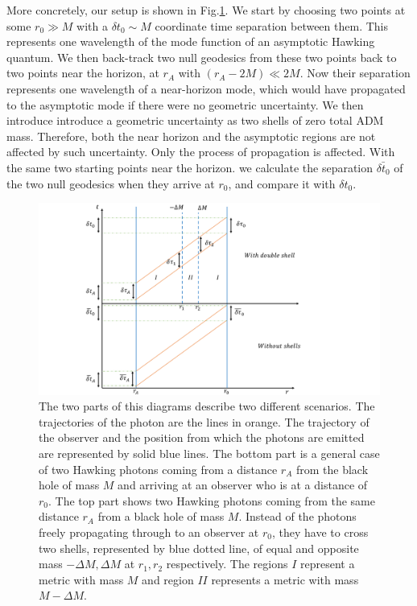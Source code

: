 \documentclass[aps,showpacs,twocolumn,floats,prd,superscriptaddress,nofootinbib]{revtex4-1}
\begin{document}
More concretely, our setup is shown in Fig.\ref{fig-setup}. 
We start by choosing two points at some $r_0\gg M$ with a $\delta t_0\sim M$ coordinate time separation between them.
This represents one wavelength of the mode function of an asymptotic Hawking quantum.
We then back-track two null geodesics from these two points back to two points near the horizon, at $r_A$ with $(r_A-2M)\ll 2M$.
Now their separation represents one wavelength of a near-horizon mode, which would have propagated to the asymptotic mode if there were no geometric uncertainty. 
We then introduce introduce a geometric uncertainty as two shells of zero total ADM mass. 
Therefore, both the near horizon and the asymptotic regions are not affected by such uncertainty.
Only the process of propagation is affected.
With the same two starting points near the horizon. we calculate the separation $\bar{\delta t_0}$ of the two null geodesics when they arrive at $r_0$, and compare it with $\delta t_0$.

\begin{figure}[tb]
\begin{center}
\includegraphics[scale = 0.6]{Propertime.pdf}
\caption{The two parts of this diagrams describe two different scenarios. The trajectories of the photon are the lines in orange. The trajectory of the observer and the position from which the photons are emitted are represented by solid blue lines. The bottom part is a general case of two Hawking photons coming from a distance $r_A$ from the black hole of mass $M$ and arriving at an observer who is at a distance of $r_0$. The top part shows two Hawking photons coming from the same distance $r_A$ from a black hole of mass $M$. Instead of the photons freely propagating through to an observer at $r_0$, they have to cross two shells, represented by blue dotted line, of equal and opposite mass $-\Delta M, \Delta M$ at $r_{1}, r_{2}$ respectively. The regions $I$ represent a metric with mass $M$ and region $II$ represents a metric with mass $M-\Delta M$.}
\label{fig-setup}
\end{center}
\end{figure}
\end{document}
